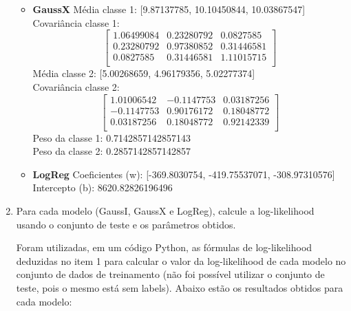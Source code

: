 \begin{enumerate}
\begin{tcolorbox}[title=Resposta (continuação):]
\begin{itemize}
                
                \item \textbf{GaussX}
                    Média classe 1: [9.87137785, 10.10450844, 10.03867547] \\
                    Covariância classe 1:
                    \[
                    \begin{bmatrix}
                        1.06499084 & 0.23280792 & 0.0827585 \\
                        0.23280792 & 0.97380852 & 0.31446581 \\
                        0.0827585  & 0.31446581 & 1.11015715 \\
                    \end{bmatrix}
                    \]
                    Média classe 2: [5.00268659, 4.96179356, 5.02277374] \\
                    Covariância classe 2:
                    \[
                    \begin{bmatrix}
                        1.01006542 & -0.1147753 & 0.03187256 \\
                        -0.1147753 & 0.90176172 & 0.18048772 \\
                        0.03187256 & 0.18048772 & 0.92142339 \\
                    \end{bmatrix}
                    \]
                    Peso da classe 1: 0.7142857142857143 \\
                    Peso da classe 2: 0.2857142857142857
                
                
                \item \textbf{LogReg}
                    Coeficientes (w): [-369.8030754, -419.75537071, -308.97310576] \\
                    Intercepto (b): 8620.82826196496

            \end{itemize}
        
        \end{tcolorbox}

    
        
    \item Para cada modelo (GaussI, GaussX e LogReg), calcule a log-likelihood usando o conjunto de teste e os parâmetros obtidos.
    \begin{tcolorbox}[title=Resposta:]
        Foram utilizadas, em um código Python, as fórmulas de log-likelihood deduzidas no item 1 para calcular o valor da log-likelihood de cada modelo no conjunto de dados de treinamento (não foi possível utilizar o conjunto de teste, pois o mesmo está sem labels). Abaixo estão os resultados obtidos para cada modelo:
        

\end{tcolorbox}
\end{enumerate}
